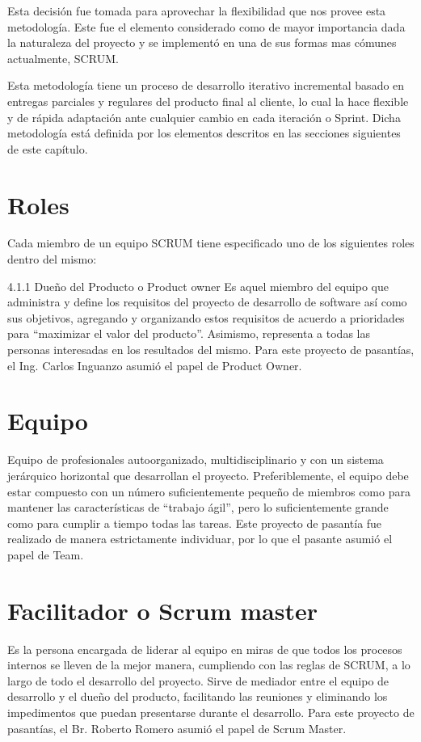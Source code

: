 Esta decisión fue tomada para aprovechar la flexibilidad que nos provee esta metodología. Este fue el elemento considerado como de mayor importancia dada la naturaleza del proyecto y se implementó en una de sus formas mas cómunes actualmente, SCRUM.


Esta metodología tiene un proceso de desarrollo iterativo incremental basado en entregas parciales y regulares del producto final al cliente, lo cual la hace flexible y de rápida adaptación ante cualquier cambio en cada iteración o Sprint. Dicha metodología está definida por los elementos descritos en las secciones siguientes de este capítulo.

\section{Roles}
Cada miembro de un equipo SCRUM tiene especificado uno de los siguientes roles dentro del mismo:

4.1.1 Dueño del Producto o Product owner
Es aquel miembro del equipo que administra y define los requisitos del proyecto de desarrollo de software así como sus objetivos, agregando y organizando estos requisitos de acuerdo a prioridades para “maximizar el valor del producto”. Asimismo, representa a todas las personas interesadas en los resultados del mismo.
Para este proyecto de pasantías, el Ing. Carlos Inguanzo asumió el papel de Product Owner.

\section{Equipo}
Equipo de profesionales autoorganizado, multidisciplinario y con un sistema jerárquico horizontal que desarrollan el proyecto. Preferiblemente, el equipo debe estar compuesto con un número suficientemente pequeño de miembros como para mantener las características de “trabajo ágil”, pero lo suficientemente grande como para cumplir a tiempo todas las tareas.
Este proyecto de pasantía fue realizado de manera estrictamente individuar, por lo que el pasante asumió el papel de Team.

\section{Facilitador o Scrum master}
Es la persona encargada de liderar al equipo en miras de que todos los procesos internos se lleven de la mejor manera, cumpliendo con las reglas de SCRUM, a lo largo de todo el desarrollo del proyecto. Sirve de mediador entre el equipo de desarrollo y el dueño del producto, facilitando las reuniones y eliminando los impedimentos que puedan presentarse durante el desarrollo.
Para este proyecto de pasantías, el Br. Roberto Romero asumió el papel de Scrum Master.

